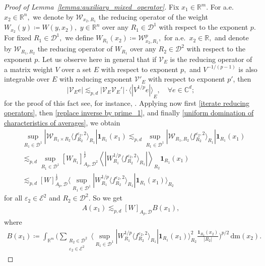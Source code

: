 \documentclass{article}
\theoremstyle{definition}
\theoremstyle{remark}
\numberwithin{equation}{section}
\newcommand{\mathdm}{\,\mathrm{dm}}
\newcommand{\cD}{\mathcal{D}}
\newcommand{\cE}{\mathcal{E}}
\newcommand{\cV}{\mathcal{V}}
\newcommand{\cW}{\mathcal{W}}
\newcommand{\bfD}{\bm{\mathcal{D}}}
\newcommand{\e}{\varepsilon}
\newcommand{\reals}{\mathbb{R}}
\newcommand{\complex}{\mathbb{C}}
\newcommand{\1}{\mathbf{1}}
\begin{document}
\begin{proof}[Proof of Lemma~\ref{lemma:auxiliary_mixed_operator}]
        Fix $x_1\in\reals^{m}.$ For a.e.~$x_2\in\reals^n,$ we denote by $\cW_{x_2,R_1}$ the reducing operator of the weight $W_{x_2}(y)\coloneq W(y,x_2),$ $y\in\reals^n$ over any $R_1\in\cD^1$ with respect to the exponent $p.$ For fixed $R_1\in\cD^1,$ we define $W_{R_1}(x_2)\coloneq \cW_{x_2,R_1}^{p},$ for a.e.~$x_2\in\reals,$ and denote by $\cW_{R_1,R_2}$ the reducing operator of $W_{R_1}$ over any $R_2\in\cD^2$ with respect to the exponent $p.$ Let us observe here in general that if $\cV_{E}$ is the reducing operator of a matrix weight $V$ over a set $E$ with respect to exponent $p,$ and $V^{-1/(p-1)}$ is also integrable over $E$ with reducing exponent $\cV'_{E}$ with respect to exponent $p'$, then
        \begin{equation}
            \label{replace inverse by prime_1}
            |\cV_{E} e|\lesssim_{p,d}|\cV_{E}\cV_{E}'|\cdot{\langle|V^{1/p}e|\rangle}_{E},\quad\forall e\in\complex^{d};
        \end{equation}
        for the proof of this fact see, for instance, \cite[Lemmas~3.1 and~3.2]{DKPS2024}. Applying now first \eqref{iterate reducing operators}, then \eqref{replace inverse by prime_1}, and finally \eqref{uniform domination of characteristics of averages}, we obtain
        \begin{align*}
            &\sup_{R_1\in\cD^1}|\cW_{R_1\times R_2}\langle f_{R_2}^{\e_2,2}\rangle_{R_1}|\1_{R_1}(x_1)\lesssim_{p,d}\sup_{R_1\in\cD^1}|\cW_{R_1,R_2}\langle f_{R_2}^{\e_2,2}\rangle_{R_1}|\1_{R_1}(x_1)\\
            &\lesssim_{p,d}
            \sup_{R_1\in\cD^1}[W_{R_1}]_{A_p,\cD^2}^{\frac{1}{p}}\left\langle|W_{R_1}^{1/p}\langle f_{R_2}^{\e_2,2}\rangle_{R_1}|\right\rangle_{R_2}\1_{R_1}(x_1)\\
            &\lesssim_{p,d}[W]_{A_p,\bfD}^{\frac{1}{p}}\bigg\langle\sup_{R_1\in\cD^1}|W_{R_1}^{1/p}\langle f_{R_2}^{\e_2,2}\rangle_{R_1}|\1_{R_1}(x_1)\bigg\rangle_{R_2}
        \end{align*}
        for all $\e_2\in\cE^2$ and $R_2\in\cD^2.$
        So we get
        \begin{align*}
            A(x_1)\lesssim_{p,d}[W]_{A_p,\bfD}B(x_1),
        \end{align*}
        where
        \begin{align*}
            B(x_1)\coloneq 
            \int_{\reals^m}\bigg(\sum_{\substack{R_2\in\cD^2\\\e_2\in\cE^2}}\bigg\langle\sup_{R_1\in\cD^1}|W_{R_1}^{1/p}\langle f_{R_2}^{\e_2,2}\rangle_{R_1}|\1_{R_1}(x_1)\bigg\rangle_{R_2}^2\frac{\1_{R_2}(x_2)}{|R_2|}\bigg)^{p/2}\mathdm(x_2).

\end{align*}
\end{proof}
\end{document}
